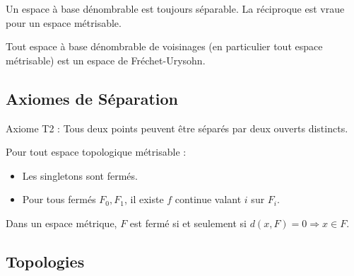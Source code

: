 \documentclass{cours}
\begin{document}
\begin{theorem}
    Un espace à base dénombrable est toujours séparable. La réciproque est vraue pour un espace métrisable.
\end{theorem}

\begin{theorem}
    Tout espace à base dénombrable de voisinages (en particulier tout espace métrisable) est un espace de Fréchet-Urysohn.
\end{theorem}

\subsection{Axiomes de Séparation}
\begin{definition}
    Axiome T2 : Tous deux points peuvent être séparés par deux ouverts distincts.
\end{definition}

\begin{theorem}
    Pour tout espace topologique métrisable :
    \begin{itemize}
        \item Les singletons sont fermés.
        \item Pour tous fermés $F_{0}, F_{1}$, il existe $f$ continue valant $i$ sur $F_{i}$.
    \end{itemize}
\end{theorem}

\begin{lemma}
    Dans un espace métrique, $F$ est fermé si et seulement si $d(x, F) = 0 \Rightarrow x \in F$.
\end{lemma}

\subsection{Topologies}
\end{document}
